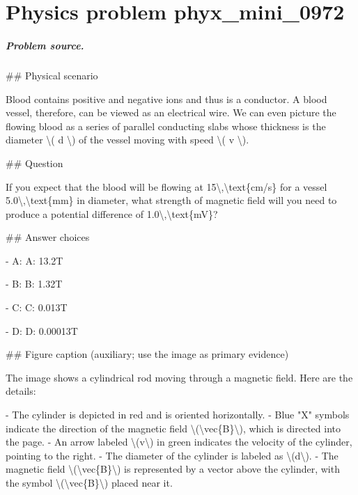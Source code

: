 
\chapter{Physics problem phyx\_mini\_0972}
\label{ch:PhyXMiniProblems_problem_phyx_mini_0972}

\paragraph{Problem source.}
\#\# Physical scenario

Blood contains positive and negative ions and thus is a conductor. A blood vessel, therefore, can be viewed as an electrical wire. We can even picture the flowing blood as a series of parallel conducting slabs whose thickness is the diameter \textbackslash{}( d \textbackslash{}) of the vessel moving with speed \textbackslash{}( v \textbackslash{}).

\#\# Question

If you expect that the blood will be flowing at 15\textbackslash{},\textbackslash{}text\{cm/s\} for a vessel 5.0\textbackslash{},\textbackslash{}text\{mm\} in diameter, what strength of magnetic field will you need to produce a potential difference of 1.0\textbackslash{},\textbackslash{}text\{mV\}?

\#\# Answer choices

- A: A: 13.2T

- B: B: 1.32T

- C: C: 0.013T

- D: D: 0.00013T

\#\# Figure caption (auxiliary; use the image as primary evidence)

The image shows a cylindrical rod moving through a magnetic field. Here are the details:

- The cylinder is depicted in red and is oriented horizontally.
- Blue "X" symbols indicate the direction of the magnetic field \textbackslash{}(\textbackslash{}vec\{B\}\textbackslash{}), which is directed into the page.
- An arrow labeled \textbackslash{}(v\textbackslash{}) in green indicates the velocity of the cylinder, pointing to the right.
- The diameter of the cylinder is labeled as \textbackslash{}(d\textbackslash{}).
- The magnetic field \textbackslash{}(\textbackslash{}vec\{B\}\textbackslash{}) is represented by a vector above the cylinder, with the symbol \textbackslash{}(\textbackslash{}vec\{B\}\textbackslash{}) placed near it.

